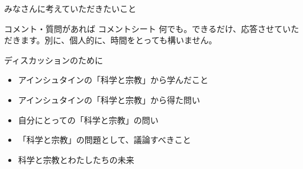 \documentclass[10pt, dvipdfmx]{beamer}
\begin{document}
\begin{frame}{みなさんに考えていただきたいこと}%

\begin{block}{コメント・質問があれば \hfill コメントシート}
何でも。できるだけ、応答させていただきます。別に、個人的に、時間をとっても構いません。
\end{block}

\begin{alertblock}{ディスカッションのために}
\begin{itemize}
\item アインシュタインの「科学と宗教」から学んだこと
\item アインシュタインの「科学と宗教」から得た問い
\item 自分にとっての「科学と宗教」の問い
\item 「科学と宗教」の問題として、議論すべきこと
\item 科学と宗教とわたしたちの未来
\end{itemize}

\end{alertblock}
%

\end{frame}

%
%
\end{document}
